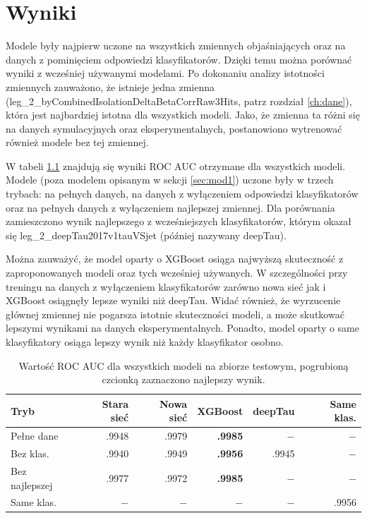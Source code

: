 \documentclass{pracalicmgr}
\begin{document}
    \chapter{Wyniki}
	Modele były najpierw uczone na wszystkich zmiennych objaśniających oraz na danych z pominięciem odpowiedzi klasyfikatorów. Dzięki temu można porównać wyniki z wcześniej używanymi modelami. Po dokonaniu analizy istotności zmiennych zauważono, że istnieje jedna zmienna (leg\_2\_byCombinedIsolationDeltaBetaCorrRaw3Hits, patrz rozdział \ref{ch:dane}), która jest najbardziej istotna dla wszystkich modeli. Jako, że zmienna ta różni się na danych symulacyjnych oraz eksperymentalnych, postanowiono wytrenować również modele bez tej zmiennej.
    
	W tabeli \ref{tab:wyniki} znajdują się wyniki ROC AUC otrzymane dla wszystkich modeli. Modele (poza modelem opisanym w sekcji \ref{sec:mod1}) uczone były w trzech trybach: na pełnych danych, na danych z wyłączeniem odpowiedzi klasyfikatorów oraz na pełnych danych z wyłączeniem najlepszej zmiennej. Dla porównania zamieszczono wynik najlepszego z wcześniejszych klasyfikatorów, którym okazał się leg\_2\_deepTau2017v1tauVSjet (później nazywany deepTau). 
	
	Można zauważyć, że model oparty o XGBoost osiąga najwyższą skuteczność z zaproponowanych modeli oraz tych wcześniej używanych. W szczególności przy treningu na danych z wyłączeniem klasyfikatorów zarówno nowa sieć jak i XGBoost osiągnęły lepsze wyniki niż deepTau. Widać również, że wyrzucenie głównej zmiennej nie pogarsza istotnie skuteczności modeli, a może skutkować lepszymi wynikami na danych eksperymentalnych. Ponadto, model oparty o same klasyfikatory osiąga lepszy wynik niż każdy klasyfikator osobno.
	
	
	\begin{table}[H]
	\centering
	\begin{tabular}{lrrrrr}
	\toprule
	Tryb & Stara sieć & Nowa sieć & XGBoost & deepTau & Same klas. \\
	\midrule
	Pełne dane & .9948 & .9979 & \textbf{.9985} & $-$ & $-$ \\
	Bez klas. & .9940 & .9949 & \textbf{.9956} & .9945 & $-$  \\
	Bez najlepszej & .9977 & .9972 & \textbf{.9985} & $-$ & $-$ \\
	Same klas. & $-$ & $-$ & $-$ & $-$ & .9956 \\
	\bottomrule
	\end{tabular}
	\caption{Wartość ROC AUC dla wszystkich modeli na zbiorze testowym, pogrubioną czcionką zaznaczono najlepszy wynik.}
	\label{tab:wyniki}
	\end{table}
\end{document}
